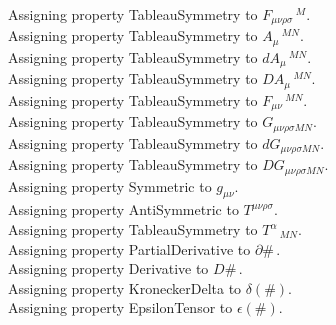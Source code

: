 \documentclass[11pt]{article}
\begin{document}
Assigning property TableauSymmetry to ${F}_{\mu \nu \rho \sigma}\,^{M}$.
\\
Assigning property TableauSymmetry to ${A}_{\mu}\,^{M N}$.
\\
Assigning property TableauSymmetry to ${dA}_{\mu}\,^{M N}$.
\\
Assigning property TableauSymmetry to ${DA}_{\mu}\,^{M N}$.
\\
Assigning property TableauSymmetry to ${F}_{\mu \nu}\,^{M N}$.
\\
Assigning property TableauSymmetry to ${G}_{\mu \nu \rho \sigma M N}$.
\\
Assigning property TableauSymmetry to ${dG}_{\mu \nu \rho \sigma M N}$.
\\
Assigning property TableauSymmetry to ${DG}_{\mu \nu \rho \sigma M N}$.
\\
Assigning property Symmetric to ${g}_{\mu \nu}$.
\\
Assigning property AntiSymmetric to ${T}^{\mu \nu \rho \sigma}$.
\\
Assigning property TableauSymmetry to ${T}^{\alpha}\,_{M N}$.
\\
Assigning property PartialDerivative to $\partial{\#}\, $.
\\
Assigning property Derivative to $D{\#}\, $.
\\
Assigning property KroneckerDelta to $\delta(\#)$.
\\
Assigning property EpsilonTensor to $\epsilon(\#)$.
\\
\end{document}
